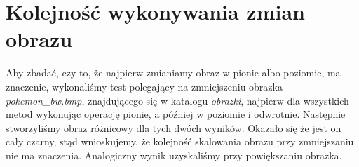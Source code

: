 \section{Kolejność wykonywania zmian obrazu}
Aby zbadać, czy to, że najpierw zmianiamy obraz w pionie albo poziomie, ma znaczenie,
wykonaliśmy test polegający na zmniejszeniu obrazka \textit{pokemon\_bw.bmp},
znajdującego się w katalogu \textit{obrazki}, najpierw dla wszystkich metod wykonując operację pionie,
a później w poziomie i odwrotnie. Następnie stworzyliśmy obraz różnicowy dla
tych dwóch wyników. Okazało się że jest on cały czarny, stąd wnioskujemy, że
kolejność skalowania obrazu przy zmniejszaniu nie ma znaczenia. Analogiczny wynik
uzyskaliśmy przy powiększaniu obrazka.
